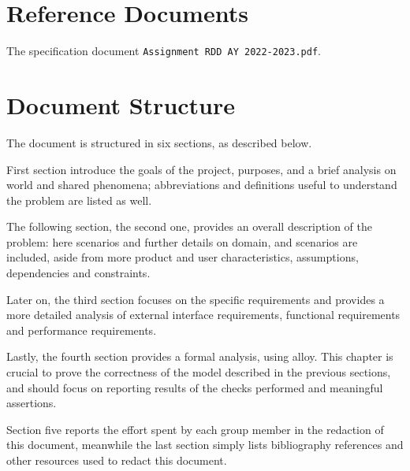 \section{Reference Documents}
\label{sec:reference_documents}
The specification document \verb|Assignment RDD AY 2022-2023.pdf|.


\section{Document Structure}
\label{sec:document_structure}
The document is structured in six sections, as described below.

First section introduce the goals of the project, purposes, and a brief analysis on world and shared phenomena;
abbreviations and definitions useful to understand the problem are listed as well.

The following section, the second one, provides an overall description of the problem: here scenarios and further
details on domain, and scenarios are included, aside from more product and user characteristics, assumptions,
dependencies and constraints.

Later on, the third section focuses on the specific requirements and provides a more detailed analysis of external
interface requirements, functional requirements and performance requirements.

Lastly, the fourth section provides a formal analysis, using alloy.
This chapter is crucial to prove the correctness of the model described in the previous sections, and should focus on
reporting results of the checks performed and meaningful assertions.

Section five reports the effort spent by each group member in the redaction of this document, meanwhile the last
section simply lists bibliography references and other resources used to redact this document.
